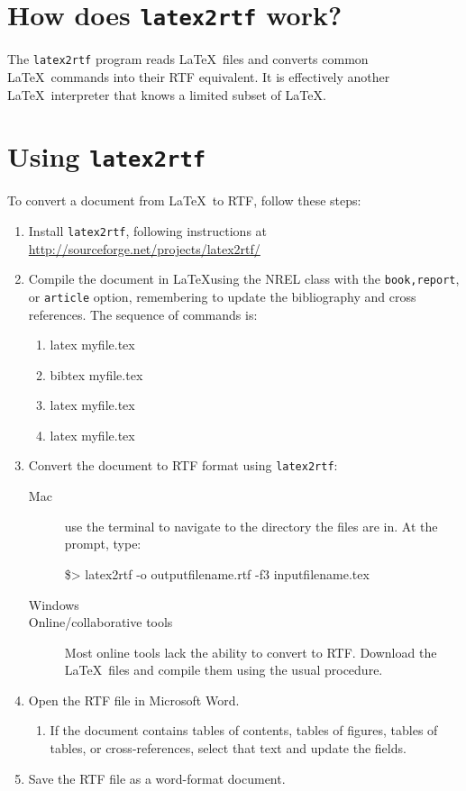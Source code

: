 \documentclass[12pt,letterpaper]{report}
\begin{document}
\section{How does \texttt{latex2rtf} work?}
The \texttt{latex2rtf} program reads \LaTeX\ files and converts common \LaTeX\ commands into their RTF equivalent. It is effectively another \LaTeX\ interpreter that knows a limited subset of \LaTeX.

\section{Using \texttt{latex2rtf}}
To convert a document from \LaTeX\ to RTF, follow these steps:
\begin{enumerate}
\item Install \texttt{latex2rtf}, following instructions at \url{http://sourceforge.net/projects/latex2rtf/}
\item Compile the document in \LaTeX using the NREL class with the \texttt{book,report}, or \texttt{article} option, remembering to update the bibliography and cross references. The sequence of commands is:
\begin{enumerate}
\item latex myfile.tex
\item bibtex myfile.tex
\item latex myfile.tex
\item latex myfile.tex
\end{enumerate}
\item Convert the document to RTF format using \texttt{latex2rtf}:
\begin{description}
\item[Mac]{use the terminal to navigate to the directory the files are in. At the prompt, type:

\$> latex2rtf -o outputfilename.rtf -f3 inputfilename.tex}
\item[Windows]
\item[Online/collaborative tools]{Most online tools lack the ability to convert to RTF. Download the \LaTeX\ files and compile them using the usual procedure.}
\end{description}

\item Open the RTF file in Microsoft Word.
\begin{enumerate}
\item If the document contains tables of contents, tables of figures, tables of tables, or cross-references, select that text and update the fields.
\end{enumerate}
\item Save the RTF file as a word-format document.
\end{enumerate}
\end{document}
